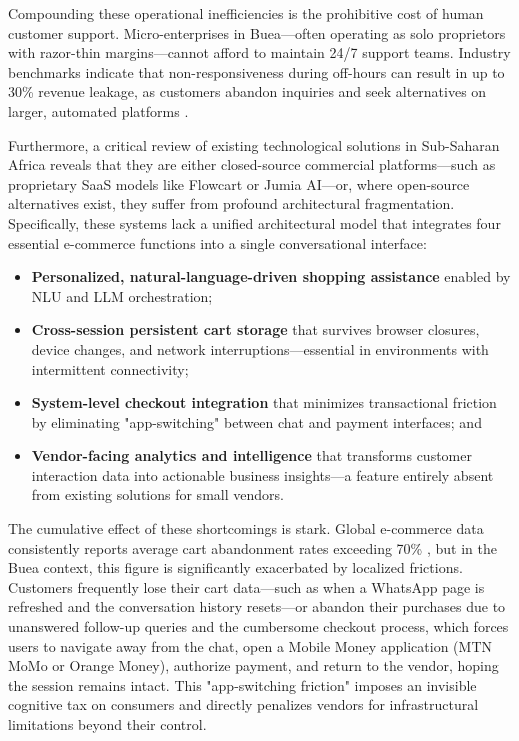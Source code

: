 \documentclass[12pt,a4paper]{article}
\begin{document}
Compounding these operational inefficiencies is the prohibitive cost of human customer support. Micro-enterprises in Buea---often operating as solo proprietors with razor-thin margins---cannot afford to maintain 24/7 support teams. Industry benchmarks indicate that non-responsiveness during off-hours can result in up to 30\% revenue leakage, as customers abandon inquiries and seek alternatives on larger, automated platforms \citep{gorgias2026, zendesk2024}.

Furthermore, a critical review of existing technological solutions in Sub-Saharan Africa reveals that they are either closed-source commercial platforms---such as proprietary SaaS models like Flowcart or Jumia AI---or, where open-source alternatives exist, they suffer from profound architectural fragmentation. Specifically, these systems lack a unified architectural model that integrates four essential e-commerce functions into a single conversational interface:

\begin{itemize}
    \item \textbf{Personalized, natural-language-driven shopping assistance} enabled by NLU and LLM orchestration;
    \item \textbf{Cross-session persistent cart storage} that survives browser closures, device changes, and network interruptions---essential in environments with intermittent connectivity;
    \item \textbf{System-level checkout integration} that minimizes transactional friction by eliminating "app-switching" between chat and payment interfaces; and
    \item \textbf{Vendor-facing analytics and intelligence} that transforms customer interaction data into actionable business insights---a feature entirely absent from existing solutions for small vendors.
\end{itemize}

The cumulative effect of these shortcomings is stark. Global e-commerce data consistently reports average cart abandonment rates exceeding 70\% \citep{statista2024, baymard2023}, but in the Buea context, this figure is significantly exacerbated by localized frictions. Customers frequently lose their cart data---such as when a WhatsApp page is refreshed and the conversation history resets---or abandon their purchases due to unanswered follow-up queries and the cumbersome checkout process, which forces users to navigate away from the chat, open a Mobile Money application (MTN MoMo or Orange Money), authorize payment, and return to the vendor, hoping the session remains intact. This "app-switching friction" imposes an invisible cognitive tax on consumers and directly penalizes vendors for infrastructural limitations beyond their control.
\end{document}
